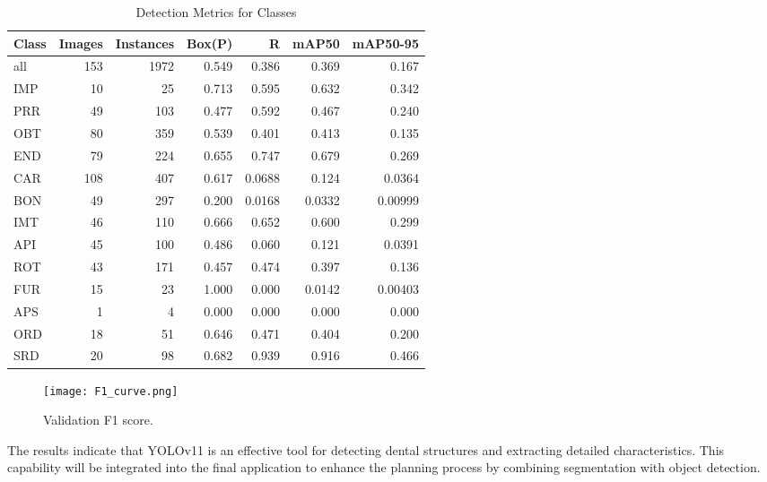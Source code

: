 \documentclass[12pt]{article}
\begin{document}
\begin{table}[htbp]
    \centering
    \caption{Detection Metrics for Classes}
    \begin{tabular}{lrrrrrr}
        \toprule
        \textbf{Class} & \textbf{Images} & \textbf{Instances} & \textbf{Box(P)} & \textbf{R} & \textbf{mAP50} & \textbf{mAP50-95} \\
        \midrule
        all  & 153  & 1972 & 0.549 & 0.386  & 0.369  & 0.167 \\
        IMP  & 10   & 25   & 0.713 & 0.595  & 0.632  & 0.342 \\
        PRR  & 49   & 103  & 0.477 & 0.592  & 0.467  & 0.240 \\
        OBT  & 80   & 359  & 0.539 & 0.401  & 0.413  & 0.135 \\
        END  & 79   & 224  & 0.655 & 0.747  & 0.679  & 0.269 \\
        CAR  & 108  & 407  & 0.617 & 0.0688 & 0.124  & 0.0364 \\
        BON  & 49   & 297  & 0.200 & 0.0168 & 0.0332 & 0.00999 \\
        IMT  & 46   & 110  & 0.666 & 0.652  & 0.600  & 0.299 \\
        API  & 45   & 100  & 0.486 & 0.060  & 0.121  & 0.0391 \\
        ROT  & 43   & 171  & 0.457 & 0.474  & 0.397  & 0.136 \\
        FUR  & 15   & 23   & 1.000 & 0.000  & 0.0142 & 0.00403 \\
        APS  & 1    & 4    & 0.000 & 0.000  & 0.000  & 0.000 \\
        ORD  & 18   & 51   & 0.646 & 0.471  & 0.404  & 0.200 \\
        SRD  & 20   & 98   & 0.682 & 0.939  & 0.916  & 0.466 \\
        \bottomrule
    \end{tabular}
    \label{tab:detection_metrics}
\end{table}

\begin{figure}[H]
    \centering
    \texttt{[image: F1\_curve.png]}
    \caption{Validation F1 score.}
    \label{fig:yolo-output}
\end{figure}

\newpage

The results indicate that YOLOv11 is an effective tool for detecting dental structures and extracting detailed characteristics. This capability will be integrated into the final application to enhance the planning process by combining segmentation with object detection.
\end{document}
